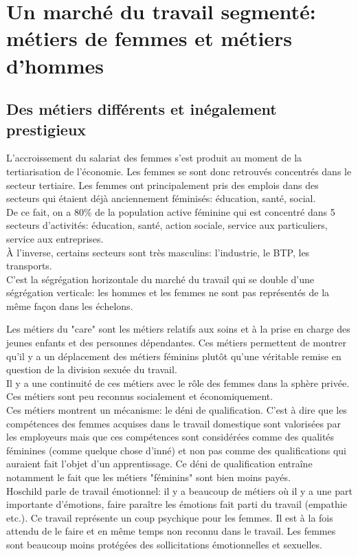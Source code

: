 \documentclass[10pt, a4paper, openany]{book}
\begin{document}
\section{Un marché du travail segmenté: métiers de femmes et métiers d'hommes}

\subsection{Des métiers différents et inégalement prestigieux}

L'accroissement du salariat des femmes s'est produit au moment de la tertiarisation de l'économie. Les femmes se sont donc retrouvés concentrés dans le secteur tertiaire. Les femmes ont principalement pris des emplois dans des secteurs qui étaient déjà anciennement féminisés: éducation, santé, social. \\
De ce fait, on a 80\% de la population active féminine qui est concentré dans 5 secteurs d'activités: éducation, santé, action sociale, service aux particuliers, service aux entreprises. \\
À l'inverse, certains secteurs sont très masculins: l'industrie, le BTP, les transports. \\
C'est la ségrégation horizontale du marché du travail qui se double d'une ségrégation verticale: les hommes et les femmes ne sont pas représentés de la même façon dans les échelons.


Les métiers du "care" sont les métiers relatifs aux soins et à la prise en charge des jeunes enfants et des personnes dépendantes. Ces métiers permettent de montrer qu'il y a un déplacement des métiers féminins plutôt qu'une véritable remise en question de la division sexuée du travail. \\
Il y a une continuité de ces métiers avec le rôle des femmes dans la sphère privée. Ces métiers sont peu reconnus socialement et économiquement. \\
Ces métiers montrent un mécanisme: le déni de qualification. C'est à dire que les compétences des femmes acquises dans le travail domestique sont valorisées par les employeurs mais que ces compétences sont considérées comme des qualités féminines (comme quelque chose d'inné) et non pas comme des qualifications qui auraient fait l'objet d'un apprentissage. Ce déni de qualification entraîne notamment le fait que les métiers "féminins" sont bien moins payés. \\
Hoschild parle de travail émotionnel: il y a beaucoup de métiers où il y a une part importante d'émotions, faire paraître les émotions fait parti du travail (empathie etc.). Ce travail représente un coup psychique pour les femmes. Il est à la fois attendu de le faire et en même temps non reconnu dans le travail. Les femmes sont beaucoup moins protégées des sollicitations émotionnelles et sexuelles. 
\end{document}
